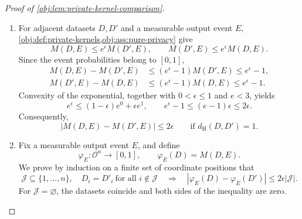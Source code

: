 \documentclass[11pt]{article}
\begin{document}
\begin{proof}[Proof of \cref{obj:lem:private-kernel-comparison}]
\begin{enumerate}
\item For adjacent datasets \(D,D'\) and a measurable output event \(E\), \cref{obj:def:private-kernels,obj:ass:pure-privacy} give
\[
M(D,E)\le e^\epsilon M(D',E),
\qquad
M(D',E)\le e^\epsilon M(D,E).
\]
Since the event probabilities belong to \([0,1]\),
\[
\begin{aligned}
M(D,E)-M(D',E)
&\le (e^\epsilon-1)M(D',E)\le e^\epsilon-1,\\
M(D',E)-M(D,E)
&\le (e^\epsilon-1)M(D,E)\le e^\epsilon-1.
\end{aligned}
\]
Convexity of the exponential, together with \(0<\epsilon\le1\) and \(e<3\), yields
\[
e^\epsilon
\le (1-\epsilon)e^0+\epsilon e^1,
\qquad
e^\epsilon-1\le (e-1)\epsilon\le2\epsilon.
\]
Consequently,
\[
|M(D,E)-M(D',E)|\le2\epsilon
\qquad\text{if }d_{\mathrm H}(D,D')=1.
\]

\item Fix a measurable output event \(E\), and define
\[
\varphi_E:\mathcal O^n\longrightarrow[0,1],
\qquad
\varphi_E(D)=M(D,E).
\]
We prove by induction on a finite set of coordinate positions that
\[
\mathcal J\subseteq\{1,\ldots,n\},
\quad
D_i=D'_i\ \text{for all }i\notin\mathcal J
\quad\Longrightarrow\quad
|\varphi_E(D)-\varphi_E(D')|
\le2\epsilon|\mathcal J|.
\]
For \(\mathcal J=\varnothing\), the datasets coincide and both sides of the inequality are zero.


\end{enumerate}
\end{proof}
\end{document}
